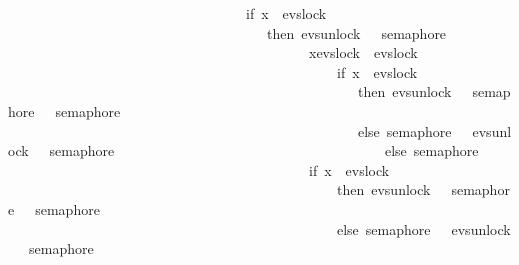 \begin{isabellebody}
\ \ \ \ \ \ \ \ \ \ \ \ \ \ \ \ \ \ \ \ \ \ \ \ \ \ \ \ \ \ \ \ \ {\isasymrightarrow}\ {\isacharparenleft}{\kern0pt}if\ x\ {\isacharequal}{\kern0pt}\ evs{\isachardot}{\kern0pt}lock\ {}\isanewline
\ \ \ \ \ \ \ \ \ \ \ \ \ \ \ \ \ \ \ \ \ \ \ \ \ \ \ \ \ \ \ \ \ \ \ \ \ then\ evs{\isachardot}{\kern0pt}unlock\ {}\ {\isasymrightarrow}\ semaphore\ {}\ \isanewline
\ \ \ \ \ \ \ \ \ \ \ \ \ \ \ \ \ \ \ \ \ \ \ \ \ \ \ \ \ \ \ \ \ \ \ \ \ \ \ \ \ \ {\isacharbar}{\kern0pt}{\isacharbar}{\kern0pt}{\isacharbar}{\kern0pt}\ {\isasymbox}x{\isasymin}{\isacharbraceleft}{\kern0pt}evs{\isachardot}{\kern0pt}lock\ {}{\isacharcomma}{\kern0pt}\ evs{\isachardot}{\kern0pt}lock\ {}{\isacharbraceright}{\kern0pt}\isanewline
\ \ \ \ \ \ \ \ \ \ \ \ \ \ \ \ \ \ \ \ \ \ \ \ \ \ \ \ \ \ \ \ \ \ \ \ \ \ \ \ \ \ \ \ \ \ {\isasymrightarrow}\ {\isacharparenleft}{\kern0pt}if\ x\ {\isacharequal}{\kern0pt}\ evs{\isachardot}{\kern0pt}lock\ {}\ \isanewline
\ \ \ \ \ \ \ \ \ \ \ \ \ \ \ \ \ \ \ \ \ \ \ \ \ \ \ \ \ \ \ \ \ \ \ \ \ \ \ \ \ \ \ \ \ \ \ \ \ \ then\ evs{\isachardot}{\kern0pt}unlock\ {}\ {\isasymrightarrow}\ semaphore\ {}\ {\isacharbar}{\kern0pt}{\isacharbar}{\kern0pt}{\isacharbar}{\kern0pt}\ semaphore\ {}\isanewline
\ \ \ \ \ \ \ \ \ \ \ \ \ \ \ \ \ \ \ \ \ \ \ \ \ \ \ \ \ \ \ \ \ \ \ \ \ \ \ \ \ \ \ \ \ \ \ \ \ \ else\ semaphore\ {}\ {\isacharbar}{\kern0pt}{\isacharbar}{\kern0pt}{\isacharbar}{\kern0pt}\ evs{\isachardot}{\kern0pt}unlock\ {}\ {\isasymrightarrow}\ semaphore\ {}{\isacharparenright}{\kern0pt}\isanewline
\ \ \ \ \ \ \ \ \ \ \ \ \ \ \ \ \ \ \ \ \ \ \ \ \ \ \ \ \ \ \ \ \ \ \ \ \ else\ semaphore\ {}\ \isanewline
\ \ \ \ \ \ \ \ \ \ \ \ \ \ \ \ \ \ \ \ \ \ \ \ \ \ \ \ \ \ \ \ \ \ \ \ \ \ \ \ \ \ {\isacharbar}{\kern0pt}{\isacharbar}{\kern0pt}{\isacharbar}{\kern0pt}\ {\isacharparenleft}{\kern0pt}if\ x\ {\isacharequal}{\kern0pt}\ evs{\isachardot}{\kern0pt}lock\ {}\ \isanewline
\ \ \ \ \ \ \ \ \ \ \ \ \ \ \ \ \ \ \ \ \ \ \ \ \ \ \ \ \ \ \ \ \ \ \ \ \ \ \ \ \ \ \ \ \ \ \ then\ evs{\isachardot}{\kern0pt}unlock\ {}\ {\isasymrightarrow}\ semaphore\ {}\ {\isacharbar}{\kern0pt}{\isacharbar}{\kern0pt}{\isacharbar}{\kern0pt}\ semaphore\ {}\isanewline
\ \ \ \ \ \ \ \ \ \ \ \ \ \ \ \ \ \ \ \ \ \ \ \ \ \ \ \ \ \ \ \ \ \ \ \ \ \ \ \ \ \ \ \ \ \ \ else\ semaphore\ {}\ {\isacharbar}{\kern0pt}{\isacharbar}{\kern0pt}{\isacharbar}{\kern0pt}\ evs{\isachardot}{\kern0pt}unlock\ {}\ {\isasymrightarrow}\ semaphore\ {}{\isacharparenright}{\kern0pt}{\isacharparenright}{\kern0pt}\isanewline

\end{isabellebody}
